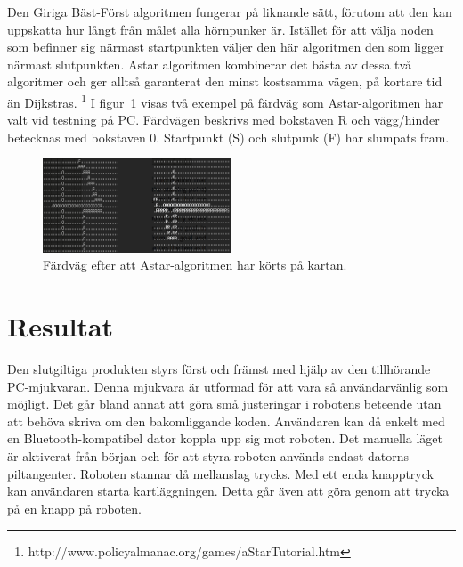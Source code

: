 \documentclass[a4paper,12pt,fleqn]{article}
\begin{document}
Den Giriga Bäst-Först algoritmen fungerar på liknande sätt, förutom att den kan uppskatta hur långt från målet alla hörnpunker är. Istället för att välja noden som befinner sig närmast startpunkten väljer den här algoritmen den som ligger närmast slutpunkten. Astar algoritmen kombinerar det bästa av dessa två algoritmer och ger alltså garanterat den minst kostsamma vägen, på kortare tid än Dijkstras. \footnote{http://www.policyalmanac.org/games/aStarTutorial.htm}
\newline
I figur~\ref{fig:Astar} visas två exempel på färdväg som Astar-algoritmen har valt vid testning på PC. Färdvägen beskrivs med bokstaven R och vägg/hinder betecknas med bokstaven 0. Startpunkt (S) och slutpunk (F) har slumpats fram. 

\begin{figure}[htp] %
  \begin{center}
  \includegraphics[width=0.5\textwidth]{Astar.png}  %
  \caption{Färdväg efter att Astar-algoritmen har körts på kartan.}%
  \end{center}
  \label{fig:Astar}
\end{figure}


\section{Resultat}

Den slutgiltiga produkten styrs först och främst med hjälp av den tillhörande PC-mjukvaran. Denna mjukvara är utformad för att vara så användarvänlig som möjligt. Det går bland annat att göra små justeringar i robotens beteende utan att behöva skriva om den bakomliggande koden. Användaren kan då enkelt med en Bluetooth-kompatibel dator koppla upp sig mot roboten. Det manuella läget är aktiverat från början och för att styra roboten används endast datorns piltangenter. Roboten stannar då mellanslag trycks. Med ett enda knapptryck kan användaren starta kartläggningen. Detta går även att göra genom att trycka på en knapp på roboten.
\end{document}
